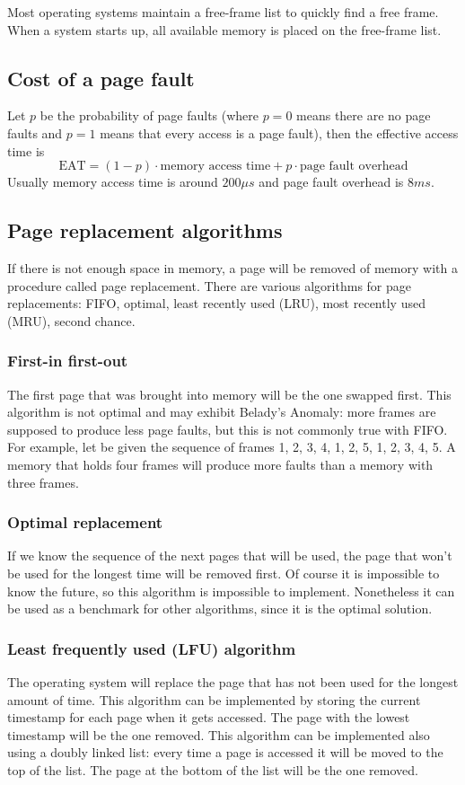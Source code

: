 Most operating systems maintain a free-frame list to quickly find a free frame. When a system starts up, all available memory is placed on the free-frame list.

\subsection{Cost of a page fault}

Let $p$ be the probability of page faults (where $p=0$ means there are no page faults and $p=1$ means that every access is a page fault), then the effective access time is
$$ \text{EAT}=(1-p)\cdot\text{memory access time} + p\cdot\text{page fault overhead} $$
Usually memory access time is around $200\mu s$ and page fault overhead is $8 ms$.

\subsection{Page replacement algorithms}

If there is not enough space in memory, a page will be removed of memory with a procedure called page replacement. There are various algorithms for page replacements: FIFO, optimal, least recently used (LRU), most recently used (MRU), second chance.

\subsubsection{First-in first-out}
The first page that was brought into memory will be the one swapped first. This algorithm is not optimal and may exhibit Belady's Anomaly: more frames are supposed to produce less page faults, but this is not commonly true with FIFO. For example, let be given the sequence of frames 1, 2, 3, 4, 1, 2, 5, 1, 2, 3, 4, 5. A memory that holds four frames will produce more faults than a memory with three frames.

\subsubsection{Optimal replacement}
If we know the sequence of the next pages that will be used, the page that won't be used for the longest time will be removed first. Of course it is impossible to know the future, so this algorithm is impossible to implement. Nonetheless it can be used as a benchmark for other algorithms, since it is the optimal solution.

\subsubsection{Least frequently used (LFU) algorithm}
The operating system will replace the page that has not been used for the longest amount of time. This algorithm can be implemented by storing the current timestamp for each page when it gets accessed. The page with the lowest timestamp will be the one removed. This algorithm can be implemented also using a doubly linked list: every time a page is accessed it will be moved to the top of the list. The page at the bottom of the list will be the one removed.

